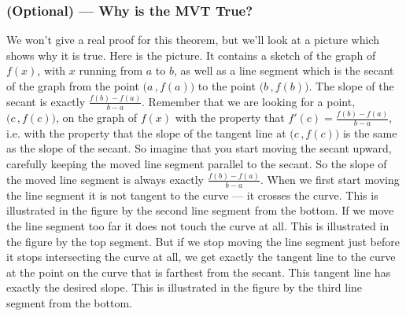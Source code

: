 \subsubsection*{(Optional) --- Why is the MVT True?}
We won't give a real proof for this theorem, but we'll look at a picture
which shows why it is true. Here is the picture. It contains a sketch of
the graph of $f(x)$, with $x$ running from $a$ to $b$, as well as
a line segment which is the secant of the graph from the point
$\big(a\,,f(a)\big)$ to the point $\big(b\,,f(b)\big)$. The slope of
the secant is exactly $\frac{f(b)-f(a)}{b-a}$.
Remember that we are looking for a point, $\big(c\,,f(c)\big)$, on the
graph of $f(x)$ with the property that $f'(c)=\frac{f(b)-f(a)}{b-a}$,
i.e. with the property that the slope of the tangent line at
$\big(c\,,f(c)\big)$ is the same as the slope of the secant.
So imagine that you start moving the secant upward, carefully keeping
the moved line segment parallel to the secant. So the slope of the
moved line segment is always exactly  $\frac{f(b)-f(a)}{b-a}$.
When we first start moving the line segment it is not tangent to the curve ---
it crosses the curve. This is illustrated in the figure by the second line
segment from the bottom.
If we move the line segment too far it does not touch the curve at all.
This is illustrated in the figure by the top segment. But if we stop
moving the line segment just before it stops intersecting the curve at
all, we get exactly the tangent line to the curve at the point on the curve
that is farthest from the secant. This tangent line has exactly the desired
slope. This is illustrated in the figure by the third line
segment from the bottom.

